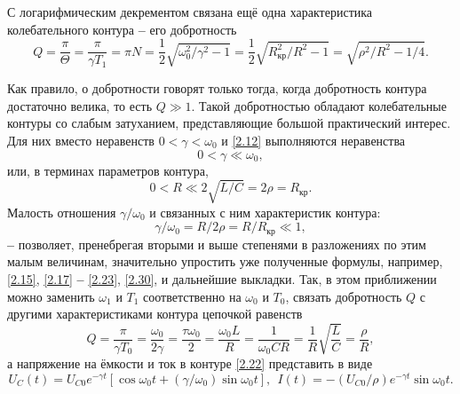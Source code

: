 С логарифмическим декрементом связана ещё одна характеристика колебательного контура \textbf{--} его \textsf{добротность}
{\large
\begin{equation}\label{2.30}
Q=\dfrac{\pi}{\Theta}=\dfrac{\pi}{\gamma T_1}=\pi N=\frac{1}{2}\sqrt{\omega_0^2/\gamma^2-1}
=\frac{1}{2}\sqrt{R_{\text{кр}}^2/R^2-1}=\sqrt{\rho^2/R^2-1/4}.
\end{equation}}

Как правило, о добротности говорят только тогда, когда добротность контура достаточно ве\-лика, то есть $Q\gg1.$ Такой добротностью обладают колебательные контуры со \textsf{слабым} за\-ту\-ха\-ни\-ем, представляющие большой практический интерес. Для них вместо неравенств $0<\gamma<\omega_0$ и \eqref{2.12} выполняются неравенства
\begin{equation}\label{2.31}
0<\gamma\ll\omega_0,
\end{equation}
или, в терминах параметров контура,
\begin{equation}\label{2.32}
0<R\ll2\sqrt{L/C}=2\rho=R_{\text{кр}}.
\end{equation}
Малость отношения $\gamma/\omega_0$ и связанных с ним характеристик контура:
\begin{equation}\label{2.33}
\gamma/\omega_0=R/2\rho=R/R_{\text{кр}}\ll1,
\end{equation}
\textbf{--} позволяет, пренебрегая вторыми и выше степенями в разложениях по этим малым величинам, значительно упростить уже полученные формулы, например, \eqref{2.15}, \eqref{2.17} \textbf{--}  \eqref{2.23}, \eqref{2.30}, и дальнейшие выкладки. Так, в этом приближении можно заменить $\omega_1$ и $T_1$ соответственно на $\omega_0$ и $T_0$, связать добротность $Q$ с другими характеристиками контура цепочкой равенств
\begin{equation}\label{2.34}
Q=\dfrac{\pi}{\gamma T_0}=\dfrac{\omega_0}{2\gamma}=\dfrac{\tau\omega_0}{2}=\dfrac{\omega_0L}{R}=\dfrac{1}{\omega_0CR}=\dfrac{1}{R}\sqrt{\dfrac{L}{C}}=\dfrac{\rho}{R},
\end{equation}
а напряжение на ёмкости и ток в контуре \eqref{2.22} представить в виде
\begin{equation}\label{2.35}
U_C(t)=U_{C0}e^{-\gamma t}[\cos\omega_0t+(\gamma/\omega_0)\sin\omega_0t],~~I(t)=-(U_{C0}/\rho)e^{-\gamma t}\sin\omega_0 t.
\end{equation}

